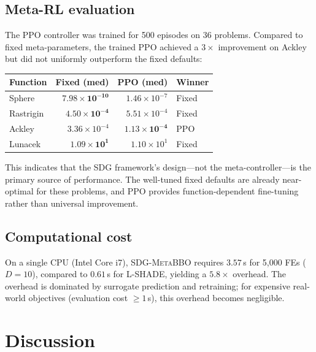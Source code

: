 \documentclass[preprint,12pt,authoryear]{elsarticle}
\newcommand{\sdg}{\textsc{SDG-MetaBBO}}
\begin{document}
\subsection{Meta-RL evaluation}

The PPO controller was trained for 500 episodes on 36 problems. Compared to fixed meta-parameters, the trained PPO achieved a $3\times$ improvement on Ackley but did not uniformly outperform the fixed defaults:

\begin{center}
\begin{tabular}{lrrl}
\toprule
Function & Fixed (med) & PPO (med) & Winner \\
\midrule
Sphere & $\mathbf{7.98 \times 10^{-10}}$ & $1.46 \times 10^{-7}$ & Fixed \\
Rastrigin & $\mathbf{4.50 \times 10^{-4}}$ & $5.51 \times 10^{-4}$ & Fixed \\
Ackley & $3.36 \times 10^{-4}$ & $\mathbf{1.13 \times 10^{-4}}$ & PPO \\
Lunacek & $\mathbf{1.09 \times 10^{1}}$ & $1.10 \times 10^{1}$ & Fixed \\
\bottomrule
\end{tabular}
\end{center}

This indicates that the SDG framework's design---not the meta-controller---is the primary source of performance. The well-tuned fixed defaults are already near-optimal for these problems, and PPO provides function-dependent fine-tuning rather than universal improvement.

\subsection{Computational cost}

On a single CPU (Intel Core i7), \sdg{} requires $3.57$\,s for 5{,}000 FEs ($D = 10$), compared to $0.61$\,s for L-SHADE, yielding a $5.8\times$ overhead. The overhead is dominated by surrogate prediction and retraining; for expensive real-world objectives (evaluation cost $\geq 1$\,s), this overhead becomes negligible.

\section{Discussion}
\label{sec:discussion}
\end{document}
